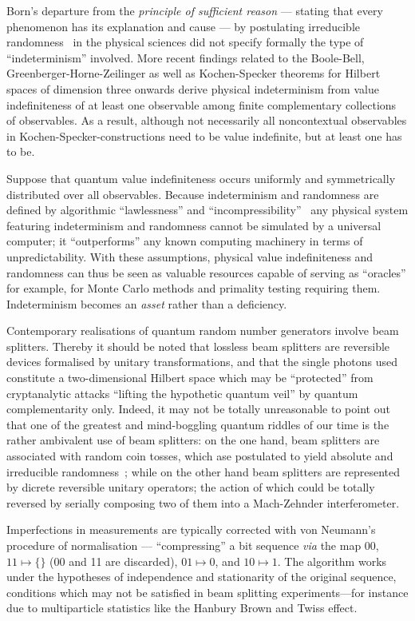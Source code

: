 \documentclass[12pt]{article}
\begin{document}
Born's departure from  the {\em principle of sufficient reason}
--- stating that every phenomenon has its explanation and cause ---
by postulating irreducible randomness~\cite{zeil-05_nature_ofQuantum} in the physical sciences did not specify formally the
type of ``indeterminism'' involved.
More recent findings related to the Boole-Bell, Greenberger-Horne-Zeilinger
as well as Kochen-Specker theorems for Hilbert spaces of dimension three onwards derive physical indeterminism
from value indefiniteness of at least one observable among finite complementary collections of observables.
As a result, although not necessarily all noncontextual observables in Kochen-Specker-constructions need to be value indefinite,
but at least one has to be.


Suppose that quantum value indefiniteness occurs uniformly and symmetrically distributed over all observables.
Because indeterminism and randomness are defined by algorithmic ``lawlessness'' and ``incompressibility''~\cite{chaitin:01}
any physical system featuring indeterminism and randomness cannot be simulated by a universal computer;
it ``outperforms'' any known computing machinery in terms of unpredictability.
With these assumptions, physical value indefiniteness and randomness  can thus be seen as valuable resources capable of serving as ``oracles''
for example, for Monte Carlo methods and primality testing requiring them.
Indeterminism becomes  an {\em asset} rather than a deficiency.

Contemporary realisations of quantum random number generators
involve beam splitters.
Thereby it should be noted that lossless beam splitters are reversible devices formalised by unitary transformations,
and that the single photons used constitute a two-dimensional Hilbert space which may be ``protected''
from cryptanalytic attacks ``lifting the hypothetic quantum veil'' by quantum complementarity only.
Indeed, it may not be totally unreasonable to point out that one of the greatest and mind-boggling quantum riddles of our time
is the rather ambivalent use of beam splitters:
on the one hand,   beam splitters are associated with random coin tosses, which ase
postulated to
yield absolute and irreducible randomness~\cite{zeil-05_nature_ofQuantum};
while on the other hand  beam splitters
are represented by dicrete reversible unitary operators;
the action of which could be totally reversed by serially composing two of them into a Mach-Zehnder interferometer.

Imperfections in measurements are typically corrected with von Neumann's procedure of normalisation --- ``compressing'' a bit sequence {\it via} the map
$00$,$11 \mapsto \{\}$ (00 and 11 are discarded),
$01 \mapsto 0$, and
$10 \mapsto 1$. The algorithm works under the hypotheses of
 independence and stationarity of the original sequence,
conditions which may not be satisfied in beam splitting experiments---for instance due to multiparticle statistics like the Hanbury Brown and Twiss effect.
\end{document}
